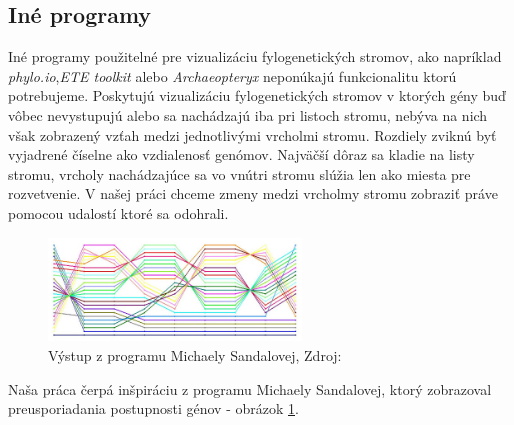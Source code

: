 \subsection{Iné programy}
Iné programy použitelné pre vizualizáciu fylogenetických stromov, ako napríklad \emph{phylo.io},\emph{ETE toolkit} alebo \emph{Archaeopteryx} neponúkajú funkcionalitu ktorú potrebujeme.
Poskytujú vizualizáciu fylogenetických stromov v ktorých gény buď vôbec nevystupujú alebo sa nachádzajú iba pri listoch stromu, 
nebýva na nich však zobrazený vzťah medzi jednotlivými vrcholmi stromu. Rozdiely zviknú byť vyjadrené číselne ako vzdialenosť genómov. 
Najväčší dôraz sa kladie na listy stromu, vrcholy nachádzajúce sa vo vnútri stromu slúžia len ako miesta pre rozvetvenie. 
V našej práci chceme zmeny medzi vrcholmy stromu zobraziť práve pomocou udalostí ktoré sa odohrali.
\begin{figure}[t]
 \centering
\includegraphics[width=0.6\textwidth]{images/sandyna}
\caption{Výstup z programu Michaely Sandalovej, Zdroj: \cite{biowiki}}\label{obr:sandyna}
\end{figure}
Naša práca čerpá inšpiráciu z programu Michaely Sandalovej, ktorý zobrazoval preusporiadania postupnosti génov - obrázok \ref{obr:sandyna}.